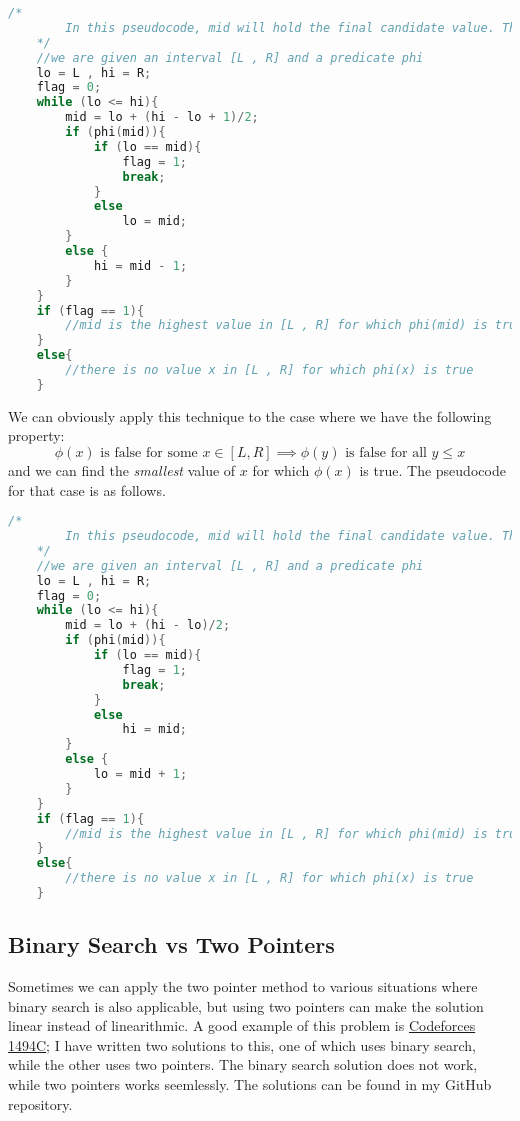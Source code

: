 \documentclass[12pt,a4paper]{amsart}
\numberwithin{equation}{section}
\theoremstyle{definition}
\begin{document}
\begin{lstlisting}[language=C++]
    /*
        In this pseudocode, mid will hold the final candidate value. The boolean variable flag represents whether or not phi(mid) is true for the final value of mid or not. 
    */
    //we are given an interval [L , R] and a predicate phi
    lo = L , hi = R;
    flag = 0;
    while (lo <= hi){
        mid = lo + (hi - lo + 1)/2;
        if (phi(mid)){
            if (lo == mid){
                flag = 1;
                break;
            }
            else 
                lo = mid;
        }
        else {
            hi = mid - 1;
        }
    }
    if (flag == 1){
        //mid is the highest value in [L , R] for which phi(mid) is true
    }
    else{
        //there is no value x in [L , R] for which phi(x) is true
    }
\end{lstlisting}

We can obviously apply this technique to the case where we have the following property: 
$$\phi(x)\text{ is false for some }x\in[L , R]\implies \phi(y)\text{ is false for all }y\le x$$
and we can find the \textit{smallest} value of $x$ for which $\phi(x)$ is true. The pseudocode for that case is as follows. 

\begin{lstlisting}[language=C++]
    /*
        In this pseudocode, mid will hold the final candidate value. The boolean variable flag represents whether or not phi(mid) is true for the final value of mid or not. 
    */
    //we are given an interval [L , R] and a predicate phi
    lo = L , hi = R;
    flag = 0;
    while (lo <= hi){
        mid = lo + (hi - lo)/2;
        if (phi(mid)){
            if (lo == mid){
                flag = 1;
                break;
            }
            else 
                hi = mid;
        }
        else {
            lo = mid + 1;
        }
    }
    if (flag == 1){
        //mid is the highest value in [L , R] for which phi(mid) is true
    }
    else{
        //there is no value x in [L , R] for which phi(x) is true
    }
\end{lstlisting}

\subsection{Binary Search vs Two Pointers} Sometimes we can apply the two pointer method to various situations where binary search is also applicable, but using two pointers can make the solution linear instead of linearithmic. A good example of this problem is \href{https://codeforces.com/contest/1494/problem/C}{Codeforces 1494C}; I have written two solutions to this, one of which uses binary search, while the other uses two pointers. The binary search solution does not work, while two pointers works seemlessly. The solutions can be found in my GitHub repository. 
\end{document}
